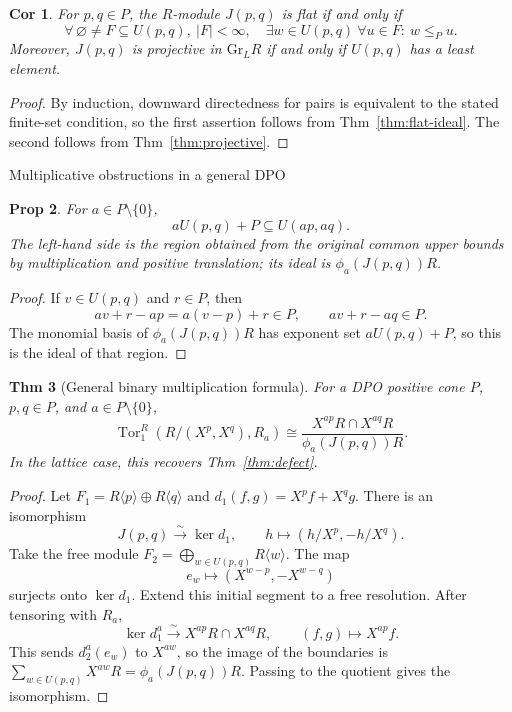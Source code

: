 \documentclass[10pt,letterpaper]{amsart}
\makeatletter
\numberwithin{equation}{section}
\newtheorem{thm}{Thm}[section]
\newtheorem{prop}[thm]{Prop}
\newtheorem{cor}[thm]{Cor}
\theoremstyle{definition}
\newcommand{\Gr}{\mathrm{Gr}}
\newcommand{\Tor}{\operatorname{Tor}}
\newcommand{\sh}[1]{\langle #1\rangle}
\def\subsection{\@startsection{subsection}{2}
  \z@{.9\linespacing\@plus.3\linespacing}{.4\linespacing}
  {\normalfont\fontsize{11.5}{14}\selectfont\bfseries\boldmath\raggedright}}
\makeatother
\begin{document}
\begin{cor}\label{cor:finite-global}
For $p,q\in P$, the $R$-module $J(p,q)$ is flat if and only if
\[
\forall\,\varnothing\ne F\subseteq U(p,q),\ |F|<\infty,\quad
\exists w\in U(p,q)\ \forall u\in F:\ w\le_Pu.
\]
Moreover, $J(p,q)$ is projective in $\Gr_LR$ if and only if $U(p,q)$ has a least element.
\end{cor}
\begin{proof}
By induction, downward directedness for pairs is equivalent to the stated finite-set condition, so the first assertion follows from Thm~\ref{thm:flat-ideal}. The second follows from Thm~\ref{thm:projective}.
\end{proof}

\subsection{Multiplicative obstructions in a general DPO}
\begin{prop}\label{prop:upper-multiplication}
For $a\in P\setminus\{0\}$,
\[
aU(p,q)+P\subseteq U(ap,aq).
\]
The left-hand side is the region obtained from the original common upper bounds by multiplication and positive translation; its ideal is $\phi_a(J(p,q))R$.
\end{prop}
\begin{proof}
If $v\in U(p,q)$ and $r\in P$, then
\[
av+r-ap=a(v-p)+r\in P,\qquad av+r-aq\in P.
\]
The monomial basis of $\phi_a(J(p,q))R$ has exponent set $aU(p,q)+P$, so this is the ideal of that region.
\end{proof}

\begin{thm}[General binary multiplication formula]\label{thm:general-binary}
For a DPO positive cone $P$, $p,q\in P$, and $a\in P\setminus\{0\}$,
\[
\Tor_1^R(R/(X^p,X^q),R_a)
\cong\frac{X^{ap}R\cap X^{aq}R}{\phi_a(J(p,q))R}.
\]
In the lattice case, this recovers Thm~\ref{thm:defect}.
\end{thm}
\begin{proof}
Let $F_1=R\sh p\oplus R\sh q$ and $d_1(f,g)=X^pf+X^qg$. There is an isomorphism
\[
J(p,q)\xrightarrow{\sim}\ker d_1,\qquad
h\mapsto(h/X^p,-h/X^q).
\]
Take the free module $F_2=\bigoplus_{w\in U(p,q)}R\sh w$. The map
\[
e_w\longmapsto(X^{w-p},-X^{w-q})
\]
surjects onto $\ker d_1$. Extend this initial segment to a free resolution. After tensoring with $R_a$,
\[
\ker d_1^a\xrightarrow{\sim}X^{ap}R\cap X^{aq}R,
\qquad(f,g)\mapsto X^{ap}f.
\]
This sends $d_2^a(e_w)$ to $X^{aw}$, so the image of the boundaries is
$\sum_{w\in U(p,q)}X^{aw}R=\phi_a(J(p,q))R$. Passing to the quotient gives the isomorphism.
\end{proof}
\end{document}
